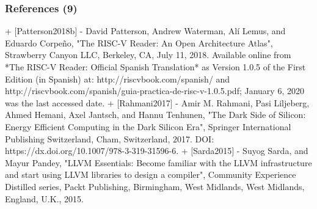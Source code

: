 \documentclass[xcolor={usenames,dvipsnames},hyperref={hyperindex,bookmarks}]{beamer}
\begin{document}
\begin{frame}
	\frametitle{References (9)}


+ $[$Patterson2018b$]$
	- David Patterson, Andrew Waterman, Al{\'{i}} Lemus, and Eduardo Corpe{\~{n}}o, "The {RISC-V} Reader: An Open Architecture Atlas", Strawberry Canyon {LLC}, Berkeley, {CA}, July 11, 2018. Available online from *The {RISC-V} Reader: Official Spanish Translation* as Version 1.0.5 of the First Edition (in Spanish) at: http://riscvbook.com/spanish/ and http://riscvbook.com/spanish/guia-practica-de-risc-v-1.0.5.pdf; January 6, 2020 was the last accessed date.
+ $[$Rahmani2017$]$
	- Amir M. Rahmani, Pasi Liljeberg, Ahmed Hemani, Axel Jantsch, and Hannu Tenhunen, "The Dark Side of Silicon: Energy Efficient Computing in the Dark Silicon Era", Springer International Publishing Switzerland, Cham, Switzerland, 2017. DOI: https://dx.doi.org/10.1007/978-3-319-31596-6.
+ $[$Sarda2015$]$
	- Suyog Sarda, and Mayur Pandey, "{LLVM} Essentials: Become familiar with the {LLVM} infrastructure and start using {LLVM} libraries to design a compiler", Community Experience Distilled series, Packt Publishing, Birmingham, West Midlands, West Midlands, England, {U.K.}, 2015.



\end{frame}
\end{document}
